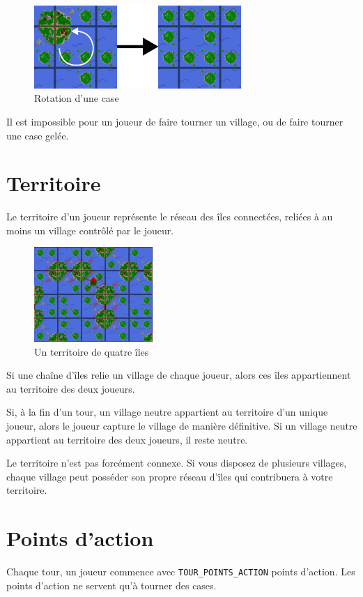 \begin{figure}[h]
    \centering
    \includegraphics[width=0.7\textwidth]{img/sprites/rotation.png}
    \caption{Rotation d'une case}
\end{figure}

Il est impossible pour un joueur de faire tourner un village, ou de faire
tourner une case gelée.

\section{Territoire}
Le territoire d'un joueur représente le réseau des îles connectées,
reliées à au moins un village contrôlé par le joueur.

\begin{figure}[h]
    \centering
    \includegraphics[width=0.4\textwidth]{img/sprites/territoire.png}
    \caption{Un territoire de quatre îles}
\end{figure}

Si une chaîne d'îles relie un village de chaque joueur, alors ces îles
appartiennent au territoire des deux joueurs.

Si, à la fin d'un tour, un village neutre appartient au territoire d'un unique
joueur, alors le joueur capture le village de manière définitive.
Si un village neutre appartient au territoire des deux joueurs, il reste neutre.

Le territoire n'est pas forcément connexe.
Si vous disposez de plusieurs villages, chaque village peut posséder son
propre réseau d'îles qui contribuera à votre territoire.

\newpage
\section{Points d'action}
Chaque tour, un joueur commence avec \texttt{TOUR\_POINTS\_ACTION} points
d'action.
Les points d'action ne servent qu'à tourner des cases.

